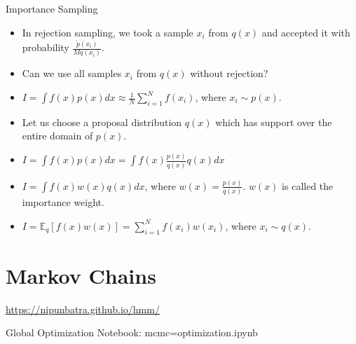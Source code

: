 \documentclass{beamer}
\begin{document}
\begin{frame}{Importance Sampling}
    \begin{itemize}
        \item In rejection sampling, we took a sample $x_i$ from $q(x)$ and accepted it with probability $\frac{\tilde{p}(x_i)}{M q(x_i)}$.
        \item Can we use all samples $x_i$ from $q(x)$ without rejection?
        \item $I = \int f(x) p(x) dx \approx \frac{1}{N} \sum_{i=1}^N f(x_i)$, where $x_i \sim p(x)$.
        \item Let us choose a proposal distribution $q(x)$ which has support over the entire domain of $p(x)$.
        \item $I = \int f(x) p(x) dx = \int f(x) \frac{p(x)}{q(x)} q(x) dx$
        \item $I = \int f(x) w(x) q(x) dx$, where $w(x) = \frac{p(x)}{q(x)}$. $w(x)$ is called the importance weight.
        \item $I = \mathbb{E}_q[f(x) w(x)] = \sum_{i=1}^N f(x_i) w(x_i)$, where $x_i \sim q(x)$.
    \end{itemize}
    
\end{frame}


\section{Markov Chains}
\begin{frame}
    \url{https://nipunbatra.github.io/hmm/}
\end{frame}

\begin{frame}{Global Optimization}
    Notebook: mcmc=optimization.ipynb
    
\end{frame}
\end{document}
